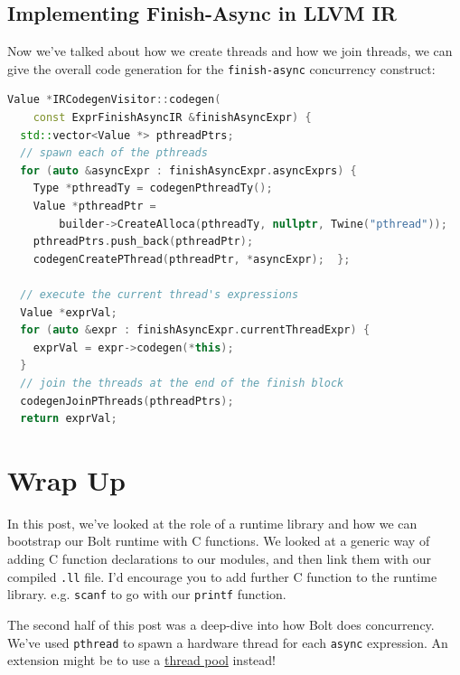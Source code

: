 \hypertarget{implementing-finish-async-in-llvm-ir}{%
\subsection{\texorpdfstring{\protect\hyperlink{implementing-finish-async-in-llvm-ir}{}Implementing
Finish-Async in LLVM
IR}{Implementing Finish-Async in LLVM IR}}\label{implementing-finish-async-in-llvm-ir}}

Now we've talked about how we create threads and how we join threads, we
can give the overall code generation for the \texttt{finish-async}
concurrency construct:

%

\begin{lstlisting}[caption={expr\_codegen.cc},language=C++]
Value *IRCodegenVisitor::codegen(
    const ExprFinishAsyncIR &finishAsyncExpr) {
  std::vector<Value *> pthreadPtrs;
  // spawn each of the pthreads
  for (auto &asyncExpr : finishAsyncExpr.asyncExprs) {
    Type *pthreadTy = codegenPthreadTy();
    Value *pthreadPtr =
        builder->CreateAlloca(pthreadTy, nullptr, Twine("pthread"));
    pthreadPtrs.push_back(pthreadPtr);
    codegenCreatePThread(pthreadPtr, *asyncExpr);  };

  // execute the current thread's expressions
  Value *exprVal;
  for (auto &expr : finishAsyncExpr.currentThreadExpr) {
    exprVal = expr->codegen(*this);
  }
  // join the threads at the end of the finish block
  codegenJoinPThreads(pthreadPtrs);
  return exprVal;
\end{lstlisting}

\hypertarget{wrap-up}{%
\section{\texorpdfstring{\protect\hyperlink{wrap-up}{}Wrap
Up}{Wrap Up}}\label{wrap-up}}

In this post, we've looked at the role of a runtime library and how we
can bootstrap our Bolt runtime with C functions. We looked at a generic
way of adding C function declarations to our modules, and then link them
with our compiled \texttt{.ll} file. I'd encourage you to add further C
function to the runtime library. e.g. \texttt{scanf} to go with our
\texttt{printf} function.

The second half of this post was a deep-dive into how Bolt does
concurrency. We've used \texttt{pthread} to spawn a hardware thread for
each \texttt{async} expression. An extension might be to use a
\href{https://en.wikipedia.org/wiki/Thread_pool\#:~:text=In\%20computer\%20programming\%2C\%20a\%20thread,execution\%20by\%20the\%20supervising\%20program.}{thread
pool} instead!

